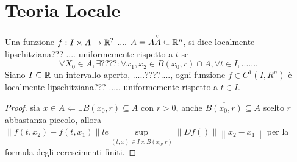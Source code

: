 \section{Teoria Locale}
 Una funzione $f:I\times A\to \mathbb{R}^{?}$ .... $A=A\overset{\circ}{A}\subseteq \mathbb{R}^n$, si dice localmente lipschitziana??? .... uniformemente rispetto a $t$ se $$\forall X_0 \in A, \exists ???? : \forall x_1,x_2 \in B(x_0,r)\cap A, \forall t\in I, .......$$
\proposition
Siano $I\subseteq \mathbb{R}$ un intervallo aperto, .....????...., ogni funzione $f\in C^1(I,R^n)$ è localmente lipschitziana??? ..... uniformemente rispetto a $t\in I$.
\begin{proof}
	sia $x\in A \Leftarrow \exists B(x_0,r)\subseteq A$ con $r>0$, anche $\overline{B(x_0,r)}\subseteq A$ scelto $r$ abbastanza piccolo, allora $\left\| f(t,x_2)-f(t,x_1)\right\|le\sup\limits_{(t,x)\in I\times \overline{B(x_0,r)}}\left\| Df() \right\|\left\| x_2-x_1 \right\|  $ per la formula degli ccrescimenti finiti.  
\end{proof}

